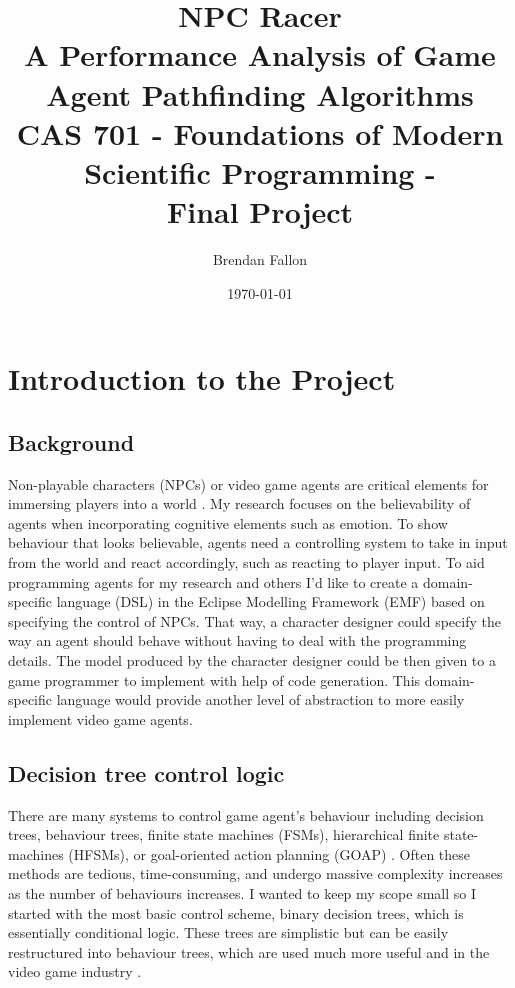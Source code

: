 \documentclass[letterpaper,12pt]{article}  %
\title{ %
    NPC Racer \\
    \large A Performance Analysis of Game Agent Pathfinding 
    Algorithms \\
    CAS 701 - Foundations of Modern Scientific Programming - \\
    Final Project}
\date{\today{}} %
\author{Brendan Fallon}
\begin{document}

\maketitle  %

\tableofcontents  %

\section{Introduction to the Project}
\subsection{Background}
Non-playable characters (NPCs) or video game agents are critical elements for immersing players into a world \cite{noauthor_toby_nodate}. My research focuses on the believability of agents when incorporating cognitive elements such as emotion. To show behaviour that looks believable, agents need a controlling system to take in input from the world and react accordingly, such as reacting to player input. To aid programming agents for my research and others I’d like to create a domain-specific language (DSL) in the Eclipse Modelling Framework (EMF) based on specifying the control of NPCs. That way, a character designer could specify the way an agent should behave without having to deal with the programming details. The model produced by the character designer could be then given to a game programmer to implement with help of code generation. This domain-specific language would provide another level of abstraction to more easily implement video game agents.

\subsection{Decision tree control logic}
There are many systems to control game agent's behaviour including decision trees, behaviour trees, finite state machines (FSMs), hierarchical finite state-machines (HFSMs), or goal-oriented action planning (GOAP) \cite{ai_and_games_behaviour_2019}. Often these methods are tedious, time-consuming, and undergo massive complexity increases as the number of behaviours increases. I wanted to keep my scope small so I started with the most basic control scheme, binary decision trees, which is essentially conditional logic. These trees are simplistic but can be easily restructured into behaviour trees, which are used much more useful and in the video game industry \cite{ai_and_games_behaviour_2019}.
\end{document}
